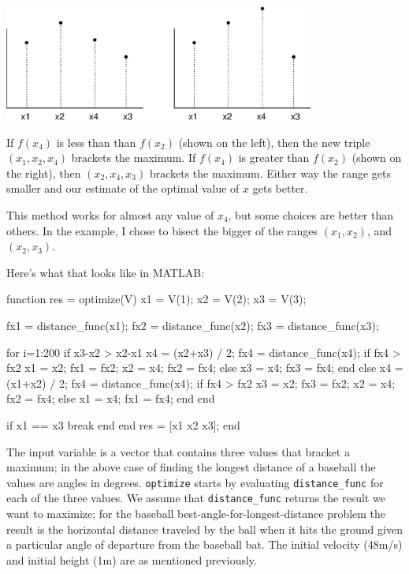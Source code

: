 \documentclass[
]{book}
\numberwithin{Answer}{chapter}
\numberwithin{Exercise}{chapter}
\begin{document}
\beforefig \centerline{\includegraphics[height=1.5in]{figs/golden2.eps}}

If $f(x_4)$ is less than than $f(x_2)$ (shown on the left), then the
new triple $(x_1, x_2, x_4)$ brackets the maximum.  If $f(x_4)$ is
greater than $f(x_2)$ (shown on the right), then $(x_2, x_4, x_3)$
brackets the maximum.  Either way the range gets smaller and our
estimate of the optimal value of $x$ gets better.

This method works for almost any value of $x_4$, but some choices
are better than others.  In the example, I chose to bisect the
bigger of the ranges $(x_1, x_2)$, and $(x_2, x_3)$.

Here's what that looks like in MATLAB:

\begin{code}
function res = optimize(V)
    x1 = V(1);
    x2 = V(2);
    x3 = V(3);

    fx1 = distance_func(x1);
    fx2 = distance_func(x2);
    fx3 = distance_func(x3);

    for i=1:200
        if x3-x2 > x2-x1
            x4 = (x2+x3) / 2;
            fx4 = distance_func(x4);
            if fx4 > fx2
                x1 = x2;  fx1 = fx2;
                x2 = x4;  fx2 = fx4;
            else
                x3 = x4;  fx3 = fx4;
            end
        else
            x4 = (x1+x2) / 2;
            fx4 = distance_func(x4);
            if fx4 > fx2
                x3 = x2;  fx3 = fx2;
                x2 = x4;  fx2 = fx4;
            else
                x1 = x4;  fx1 = fx4;
            end
        end

        if x1 == x3
            break
        end
    end
    res = [x1 x2 x3];
end
\end{code}

The input variable is a vector that contains three values that bracket
a maximum; in the above case of finding the longest distance of a baseball 
the values are angles in degrees.  {\tt optimize}
starts by evaluating {\tt distance\_func} for each of the three values.
We assume that {\tt distance\_func} returns the result we want to
maximize; for the baseball best-angle-for-longest-distance problem
the result is the horizontal distance traveled by the
ball when it hits the ground given a particular angle of departure from
the baseball bat.  The initial velocity (48m/s) and initial height (1m) 
are as mentioned previously.
\end{document}
